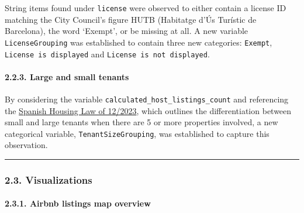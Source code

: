 \documentclass[
]{article}
\begin{document}
String items found under \texttt{license} were observed to either
contain a license ID matching the City Council's figure HUTB (Habitatge
d'Ús Turístic de Barcelona), the word `Exempt', or be missing at all. A
new variable \texttt{LicenseGrouping} was established to contain three
new categories: \texttt{Exempt}, \texttt{License\ is\ displayed} and
\texttt{License\ is\ not\ displayed}.

\hypertarget{large-and-small-tenants}{%
\paragraph{2.2.3. Large and small
tenants}\label{large-and-small-tenants}}

By considering the variable \texttt{calculated\_host\_listings\_count}
and referencing the
\href{https://www.boe.es/buscar/act.php?id=BOE-A-2023-12203}{Spanish
Housing Law of 12/2023}, which outlines the differentiation between
small and large tenants when there are 5 or more properties involved, a
new categorical variable, \texttt{TenantSizeGrouping}, was established
to capture this observation.

\begin{center}\rule{0.5\linewidth}{0.5pt}\end{center}

\hypertarget{visualizations}{%
\subsubsection{2.3. Visualizations}\label{visualizations}}

\hypertarget{airbnb-listings-map-overview}{%
\paragraph{2.3.1. Airbnb listings map
overview}\label{airbnb-listings-map-overview}}
\end{document}
